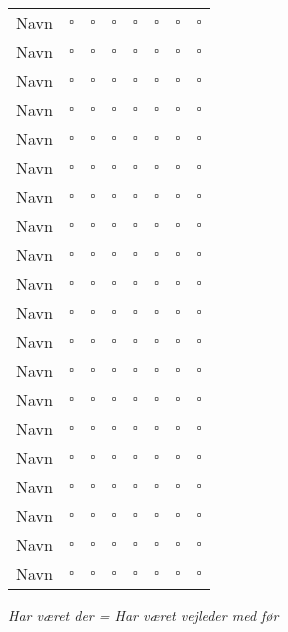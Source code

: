 \documentclass[10pt,a4paper,letterpaper]{article}
\begin{document}
\begin{tabular}{L{3.3cm}C{1.5cm}C{1.5cm}C{1.5cm}C{1.5cm}C{1.5cm}C{1.5cm}C{1.8cm}}
Navn & $\square$ & $\square$ & $\square$ & $\square$ & $\square$ & $\square$ & $\square$ \\
Navn & $\square$ & $\square$ & $\square$ & $\square$ & $\square$ & $\square$ & $\square$ \\
Navn & $\square$ & $\square$ & $\square$ & $\square$ & $\square$ & $\square$ & $\square$ \\
Navn & $\square$ & $\square$ & $\square$ & $\square$ & $\square$ & $\square$ & $\square$ \\
Navn & $\square$ & $\square$ & $\square$ & $\square$ & $\square$ & $\square$ & $\square$ \\
Navn & $\square$ & $\square$ & $\square$ & $\square$ & $\square$ & $\square$ & $\square$ \\
Navn & $\square$ & $\square$ & $\square$ & $\square$ & $\square$ & $\square$ & $\square$ \\
Navn & $\square$ & $\square$ & $\square$ & $\square$ & $\square$ & $\square$ & $\square$ \\
Navn & $\square$ & $\square$ & $\square$ & $\square$ & $\square$ & $\square$ & $\square$ \\
Navn & $\square$ & $\square$ & $\square$ & $\square$ & $\square$ & $\square$ & $\square$ \\
Navn & $\square$ & $\square$ & $\square$ & $\square$ & $\square$ & $\square$ & $\square$ \\
Navn & $\square$ & $\square$ & $\square$ & $\square$ & $\square$ & $\square$ & $\square$ \\
Navn & $\square$ & $\square$ & $\square$ & $\square$ & $\square$ & $\square$ & $\square$ \\
Navn & $\square$ & $\square$ & $\square$ & $\square$ & $\square$ & $\square$ & $\square$ \\
Navn & $\square$ & $\square$ & $\square$ & $\square$ & $\square$ & $\square$ & $\square$ \\
Navn & $\square$ & $\square$ & $\square$ & $\square$ & $\square$ & $\square$ & $\square$ \\
Navn & $\square$ & $\square$ & $\square$ & $\square$ & $\square$ & $\square$ & $\square$ \\
Navn & $\square$ & $\square$ & $\square$ & $\square$ & $\square$ & $\square$ & $\square$ \\
Navn & $\square$ & $\square$ & $\square$ & $\square$ & $\square$ & $\square$ & $\square$ \\
Navn & $\square$ & $\square$ & $\square$ & $\square$ & $\square$ & $\square$ & $\square$
\end{tabular}

\vspace*{1cm}
\textit{Har været der = Har været vejleder med før}
\end{document}
